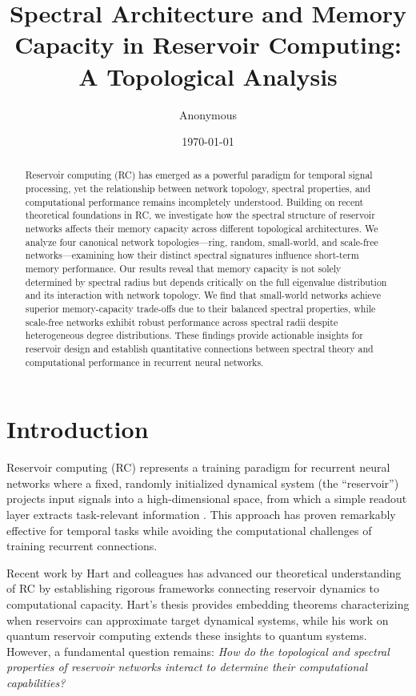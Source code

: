 \documentclass[11pt]{article}
\title{Spectral Architecture and Memory Capacity in Reservoir Computing: \\ A Topological Analysis}
\author{Anonymous}
\date{\today}
\begin{document}
\maketitle

\begin{abstract}
Reservoir computing (RC) has emerged as a powerful paradigm for temporal signal processing, yet the relationship between network topology, spectral properties, and computational performance remains incompletely understood. Building on recent theoretical foundations in RC, we investigate how the spectral structure of reservoir networks affects their memory capacity across different topological architectures. We analyze four canonical network topologies—ring, random, small-world, and scale-free networks—examining how their distinct spectral signatures influence short-term memory performance. Our results reveal that memory capacity is not solely determined by spectral radius but depends critically on the full eigenvalue distribution and its interaction with network topology. We find that small-world networks achieve superior memory-capacity trade-offs due to their balanced spectral properties, while scale-free networks exhibit robust performance across spectral radii despite heterogeneous degree distributions. These findings provide actionable insights for reservoir design and establish quantitative connections between spectral theory and computational performance in recurrent neural networks.
\end{abstract}

\section{Introduction}

Reservoir computing (RC) represents a training paradigm for recurrent neural networks where a fixed, randomly initialized dynamical system (the ``reservoir'') projects input signals into a high-dimensional space, from which a simple readout layer extracts task-relevant information \cite{jaeger2001, maass2002}. This approach has proven remarkably effective for temporal tasks while avoiding the computational challenges of training recurrent connections.

Recent work by Hart and colleagues \cite{hart2021, hart2022, hart2025} has advanced our theoretical understanding of RC by establishing rigorous frameworks connecting reservoir dynamics to computational capacity. Hart's thesis \cite{hart2021} provides embedding theorems characterizing when reservoirs can approximate target dynamical systems, while his work on quantum reservoir computing \cite{hart2025} extends these insights to quantum systems. However, a fundamental question remains: \emph{How do the topological and spectral properties of reservoir networks interact to determine their computational capabilities?}
\end{document}
